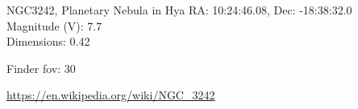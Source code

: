 \begin{block}{NGC3242, Planetary Nebula in Hya}
    RA: 10:24:46.08, Dec: -18:38:32.0 \\ 
    Magnitude (V): 7.7 \\ 
    Dimensions: 0.42 

    Finder fov: 30 

    \url{https://en.wikipedia.org/wiki/NGC_3242} 
\end{block}
